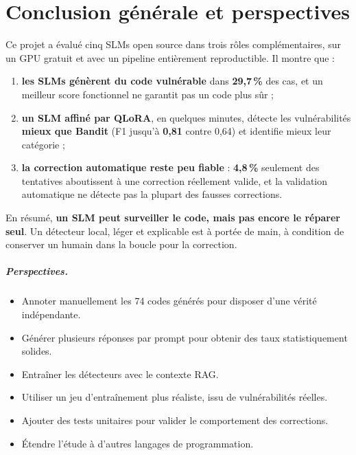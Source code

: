 \documentclass[11pt,a4paper,oneside]{report}
\begin{document}
\chapter*{Conclusion générale et perspectives}
Ce projet a évalué cinq SLMs open source dans trois rôles complémentaires, sur un GPU gratuit et avec un pipeline entièrement reproductible. Il montre que :
\begin{enumerate}
  \item \textbf{les SLMs génèrent du code vulnérable} dans \textbf{29,7\,\%} des cas, et un meilleur score fonctionnel ne garantit pas un code plus sûr ;
  \item \textbf{un SLM affiné par QLoRA}, en quelques minutes, détecte les vulnérabilités \textbf{mieux que Bandit} (F1 jusqu'à \textbf{0,81} contre 0,64) et identifie mieux leur catégorie ;
  \item \textbf{la correction automatique reste peu fiable} : \textbf{4,8\,\%} seulement des tentatives aboutissent à une correction réellement valide, et la validation automatique ne détecte pas la plupart des fausses corrections.
\end{enumerate}
En résumé, \textbf{un SLM peut surveiller le code, mais pas encore le réparer seul}. Un détecteur local, léger et explicable est à portée de main, à condition de conserver un humain dans la boucle pour la correction.

\paragraph{Perspectives.}
\begin{itemize}
  \item Annoter manuellement les 74 codes générés pour disposer d'une vérité indépendante.
  \item Générer plusieurs réponses par prompt pour obtenir des taux statistiquement solides.
  \item Entraîner les détecteurs avec le contexte RAG.
  \item Utiliser un jeu d'entraînement plus réaliste, issu de vulnérabilités réelles.
  \item Ajouter des tests unitaires pour valider le comportement des corrections.
  \item Étendre l'étude à d'autres langages de programmation.
\end{itemize}
\end{document}
